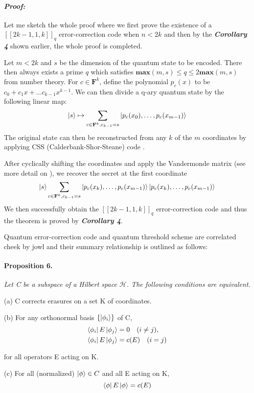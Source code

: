 \documentclass[12pt]{article}
\begin{document}
\paragraph{\textit{Proof:}}
Let me sketch the whole proof where we first prove the existence of a $[[2k-1,1,k]]_q$ error-correction code when $n<2k$ and then by the \textbf{\textit{Corollary 4}} shown earlier, the whole proof is completed.

Let $m < 2k$ and $s$ be the dimension of the quantum state to be encoded. There then always exists a prime $q$ which satisfies $\mathbf{max} (m,s) \le q \le 2 \mathbf{max } (m,s)$ from number theory. For $c \in \textbf{F}^k$, define the polynomial $p_c(x) $ to be $ c_0+c_1x+ \dots c_{k-1}x^{k-1}$. We can then divide a q-ary quantum state by the following linear map:
\begin{equation}
	\ket{s} \mapsto \sum_{c \in \mathbf{F}^k, c_{k-1} = s} \ket{p_c(x_0),\dots, p_c(x_{m-1})}
\end{equation}
The original state can then be reconstructed from any $k$ of the $m$ coordinates by applying CSS (Calderbank-Shor-Steane) code \cite{Calderbank}.

After cyclically shifting the coordinates and apply the Vandermonde matrix (see more detail on \cite{review}), we recover the secret at the first coordinate
\begin{equation}
	\ket{s} \sum_{c \in \mathbf{F}^k, c_{k-1} = s} \ket{p_c(x_k),\dots ,p_c(x_{m-1})} \ket{p_c(x_k),\dots ,p_c(x_{m-1})}
\end{equation}
We then successfully obtain the $[[2k-1,1,k]]_q$ error-correction code and thus the theorem is proved by \textbf{\textit{Corollary 4}}.

Quantum error-correction code and quantum threshold scheme are correlated cheek by jowl and their summary relationship is outlined as follows:
\paragraph{Proposition 6.}
{\itshape
Let C be a subspace of a Hilbert space $\mathcal{H}$. The following conditions are equivalent.

	(a) C corrects erasures on a set K of coordinates.

	(b) For any orthonormal basis $\{\ket{\phi_i}\}$ of C,
	\begin{align}
		\bra{\phi_i}E\ket{\phi_j} &= 0 \quad (i \ne j),\\
		\bra{\phi_i}E\ket{\phi_j} &= c(E) \quad (i = j) 
	\end{align}

	\qquad for all operators E acting on K.

	(c) For all (normalized) $\ket{\phi} \in C$ and all E acting on K,
	\begin{equation}
		\bra{\phi}E\ket{\phi} = c(E)
	\end{equation}
}
\end{document}
